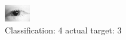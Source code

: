 \begin{figure}[h!]
\begin{center}
\includegraphics[width=0.60\columnwidth]{figures/ID116_class_4_target_3.png}
\end{center}
\caption{ Classification: 4 actual target: 3}
\label{fig:ID116_class_4_target_3}
\end{figure}
